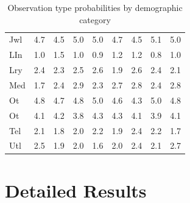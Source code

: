 \documentclass[12pt]{article}
\begin{document}
\begin{table}[!ht]
{\begin{tabular}{lllllllll}
        Jwl & 4.7 & 4.5 & 5.0 & 5.0 & 4.7 & 4.5 & 5.1 & 5.0\\
        LIn & 1.0 & 1.5 & 1.0 & 0.9 & 1.2 & 1.2 & 0.8 & 1.0\\
        Lry & 2.4 & 2.3 & 2.5 & 2.6 & 1.9 & 2.6 & 2.4 & 2.1\\
        Med & 1.7 & 2.4 & 2.9 & 2.3 & 2.7 & 2.8 & 2.4 & 2.8\\
        Ot  & 4.8 & 4.7 & 4.8 & 5.0 & 4.6 & 4.3 & 5.0 & 4.8\\
        Ot  & 4.1 & 4.2 & 3.8 & 4.3 & 4.3 & 4.1 & 3.9 & 4.1\\
        Tel & 2.1 & 1.8 & 2.0 & 2.2 & 1.9 & 2.4 & 2.2 & 1.7\\
        Utl & 2.5 & 1.9 & 2.0 & 1.6 & 2.0 & 2.4 & 2.1 & 2.7\\
        \hline
    \end{tabular}
    }%
    \caption{Observation type probabilities by demographic category}
    \label{tab:dem_vin}
\end{table}

\clearpage
\section{Detailed Results}
\label{det_res}
\end{document}
